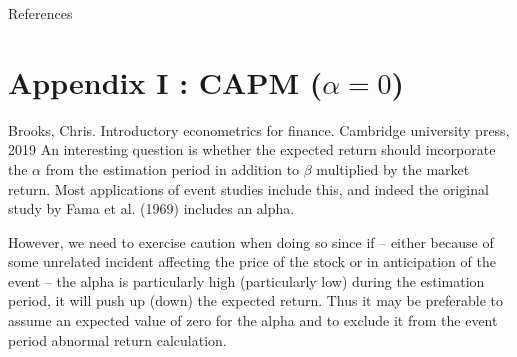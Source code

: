 \documentclass{beamer}
\begin{document}
	
	
	
	
	
	
	\tiny
	\begin{frame}[allowframebreaks]{References}
		
		{		
			
			
		}
	\end{frame}
	
	\normalsize
	
	
	
	
	
	\appendix
	
	\section{Appendix I : CAPM ($ \alpha = 0 $)}
	
	
	\begin{frame}
		\begin{block}{\footnotesize Brooks, Chris. Introductory econometrics for finance. Cambridge university press, 2019}
			\scriptsize
			An interesting question is whether the expected return should
			incorporate the $ \alpha $ from the estimation period in addition to $ \beta $ multiplied by the market return.
			Most applications of event studies include this, and indeed the original study by Fama et al. (1969) includes an alpha.
			
			However, we need to exercise caution when doing so since if – either
			because of some unrelated incident affecting the price of the stock or in
			anticipation of the event – the alpha is particularly high (particularly low) during the estimation period, it will push up (down) the expected return.
			Thus it may be preferable to assume an expected value of zero for the
			alpha and to exclude it from the event period abnormal return calculation.
		\end{block}
	\end{frame}
	
\end{document}
